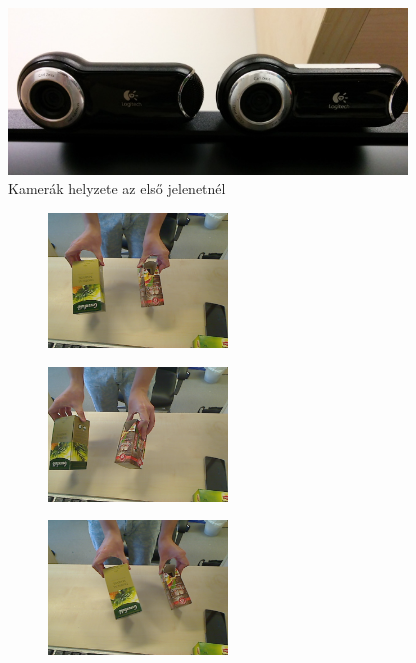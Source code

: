 \begin{figure}[tbh]
\centering
\includegraphics[width=300pt]{figures/scene1_camerapose.jpg}
\caption{Kamerák helyzete az első jelenetnél \label{fig:scene1_camerapose}}
\end{figure}

\begin{figure}[tbh]
\centering
\begin{subfigure}[b]{.32\linewidth}
	\centering
	\includegraphics[width=135pt]{figures/left_93.png}
  \end{subfigure}
\begin{subfigure}[b]{.32\linewidth}
	\centering
	\includegraphics[width=135pt]{figures/left_153.png}
  \end{subfigure}
\begin{subfigure}[b]{.32\linewidth}
	\centering
	\includegraphics[width=135pt]{figures/left_223.png}
  \end{subfigure}\\\vspace{5pt}

\end{figure}

